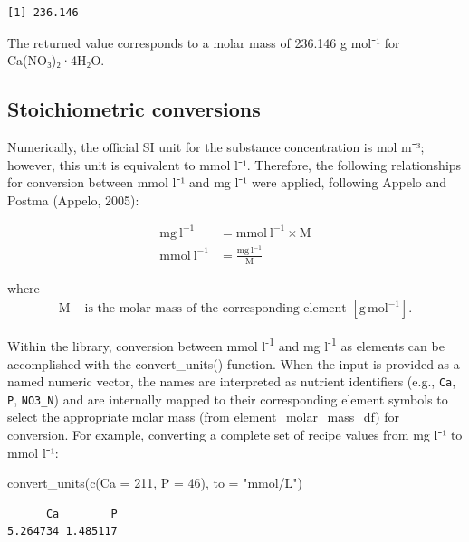 \documentclass[
  letterpaper,
  DIV=11,
  numbers=noendperiod]{scrreprt}
\newenvironment{Shaded}{\begin{snugshade}}{\end{snugshade}}
\newcommand{\AttributeTok}[1]{\textcolor[rgb]{0.40,0.45,0.13}{#1}}
\newcommand{\DecValTok}[1]{\textcolor[rgb]{0.68,0.00,0.00}{#1}}
\newcommand{\FunctionTok}[1]{\textcolor[rgb]{0.28,0.35,0.67}{#1}}
\newcommand{\NormalTok}[1]{\textcolor[rgb]{0.00,0.23,0.31}{#1}}
\newcommand{\StringTok}[1]{\textcolor[rgb]{0.13,0.47,0.30}{#1}}
\begin{document}
\begin{verbatim}
[1] 236.146
\end{verbatim}

The returned value corresponds to a molar mass of 236.146 g mol⁻¹ for
Ca(NO₃)₂·4H₂O.

\subsection{Stoichiometric
conversions}\label{stoichiometric-conversions}

Numerically, the official SI unit for the substance concentration is mol
m⁻³; however, this unit is equivalent to mmol l⁻¹. Therefore, the
following relationships for conversion between mmol l⁻¹ and mg l⁻¹ were
applied, following Appelo and Postma (Appelo, 2005):

\begin{align*}
\mathrm{mg\ l^{-1}}   &= \mathrm{mmol\ l^{-1}} \times \mathrm{M} \\
\mathrm{mmol\ l^{-1}} &= \frac{\mathrm{mg\ l^{-1}}}{\mathrm{M}}
\end{align*}

\noindent where \begin{align*}
\mathrm{M} &\text{ is the molar mass of the corresponding element } [\mathrm{g\,mol^{-1}}].
\end{align*}

Within the library, conversion between mmol l\textsuperscript{-1} and mg
l\textsuperscript{-1} as elements can be accomplished with the
convert\_units() function. When the input is provided as a named numeric
vector, the names are interpreted as nutrient identifiers (e.g.,
\texttt{Ca}, \texttt{P}, \texttt{NO3\_N}) and are internally mapped to
their corresponding element symbols to select the appropriate molar mass
(from element\_molar\_mass\_df) for conversion. For example, converting
a complete set of recipe values from mg l⁻¹ to mmol l⁻¹:

\begin{Shaded}
\begin{Highlighting}[]
\FunctionTok{convert\_units}\NormalTok{(}\FunctionTok{c}\NormalTok{(}\AttributeTok{Ca =} \DecValTok{211}\NormalTok{, }\AttributeTok{P =} \DecValTok{46}\NormalTok{), }\AttributeTok{to =} \StringTok{"mmol/L"}\NormalTok{)}
\end{Highlighting}
\end{Shaded}

\begin{verbatim}
      Ca        P 
5.264734 1.485117 
\end{verbatim}
\end{document}
